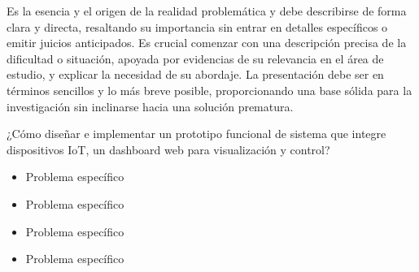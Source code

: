 
Es la esencia y el origen de la realidad problemática y debe describirse de forma clara y directa, resaltando su importancia sin entrar en detalles específicos o emitir juicios anticipados. Es crucial comenzar con una descripción precisa de la dificultad o situación, apoyada por evidencias de su relevancia en el área de estudio, y explicar la necesidad de su abordaje. La presentación debe ser en términos sencillos y lo más breve posible, proporcionando una base sólida para la investigación sin inclinarse hacia una solución prematura.

¿Cómo diseñar e implementar un prototipo funcional de sistema que integre dispositivos IoT, un dashboard web para visualización y control?


\begin{itemize}
    \item Problema específico
    \item Problema específico
    \item Problema específico
    \item Problema específico
\end{itemize}




